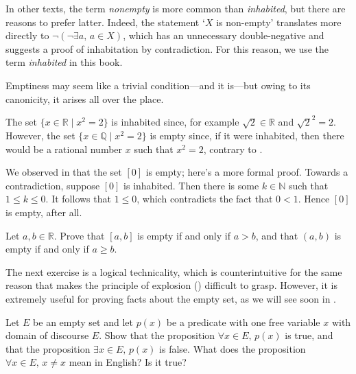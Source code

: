 In other texts, the term \textit{nonempty} is more common than \textit{inhabited}, but there are reasons to prefer latter. Indeed, the statement `$X$ is non-empty' translates more directly to $\neg(\neg \exists a,\, a \in X)$, which has an unnecessary double-negative and suggests a proof of inhabitation by contradiction. For this reason, we use the term \textit{inhabited} in this book.

Emptiness may seem like a trivial condition---and it is---but owing to its canonicity, it arises all over the place.

\begin{example}
The set $\{ x \in \mathbb{R} \mid x^2 = 2 \}$ is inhabited since, for example $\sqrt{2} \in \mathbb{R}$ and $\sqrt{2}^2 = 2$. However, the set $\{ x \in \mathbb{Q} \mid x^2 = 2 \}$ is empty since, if it were inhabited, then there would be a rational number $x$ such that $x^2 = 2$, contrary to .
\end{example}

\begin{example}
We observed in  that the set $[0]$ is empty; here's a more formal proof. Towards a contradiction, suppose $[0]$ is inhabited. Then there is some $k \in \mathbb{N}$ such that $1 \le k \le 0$. It follows that $1 \le 0$, which contradicts the fact that $0<1$. Hence $[0]$ is empty, after all.
\end{example}

\begin{exercise}
Let $a,b \in \mathbb{R}$. Prove that $[a,b]$ is empty if and only if $a > b$, and that $(a,b)$ is empty if and only if $a \ge b$.
\end{exercise}

The next exercise is a logical technicality, which is counterintuitive for the same reason that makes the principle of explosion () difficult to grasp. However, it is extremely useful for proving facts about the empty set, as we will see soon in .

\begin{exercise}
Let $E$ be an empty set and let $p(x)$ be a predicate with one free variable $x$ with domain of discourse $E$. Show that the proposition $\forall x \in E,\, p(x)$ is true, and that the proposition $\exists x \in E,\, p(x)$ is false. What does the proposition $\forall x \in E,\, x \ne x$ mean in English? Is it true?
\end{exercise}

